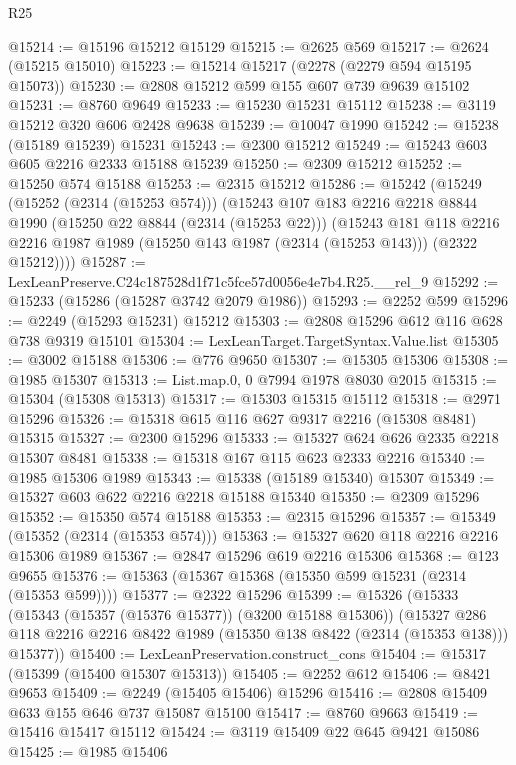 \begin{lexlean}{R25}
\begin{coremodule}
@15214 := @15196 @15212 @15129
@15215 := @2625 @569
@15217 := @2624 (@15215 @15010)
@15223 := @15214 @15217 (@2278 (@2279 @594 @15195 @15073))
@15230 := @2808 @15212 @599 @155 @607 @739 @9639 @15102
@15231 := @8760 @9649
@15233 := @15230 @15231 @15112
@15238 := @3119 @15212 @320 @606 @2428 @9638
@15239 := @10047 @1990
@15242 := @15238 (@15189 @15239) @15231
@15243 := @2300 @15212
@15249 := @15243 @603 @605 @2216 @2333 @15188 @15239
@15250 := @2309 @15212
@15252 := @15250 @574 @15188
@15253 := @2315 @15212
@15286 := @15242
    (@15249
      (@15252 (@2314 (@15253 @574)))
      (@15243
        @107
        @183
        @2216
        @2218
        @8844
        @1990
        (@15250 @22 @8844 (@2314 (@15253 @22)))
        (@15243
          @181
          @118
          @2216
          @2216
          @1987
          @1989
          (@15250 @143 @1987 (@2314 (@15253 @143)))
          (@2322 @15212))))
@15287 := LexLeanPreserve.C24c187528d1f71c5fce57d0056e4e7b4.R25.__rel_9
@15292 := @15233 (@15286 (@15287 @3742 @2079 @1986))
@15293 := @2252 @599
@15296 := @2249 (@15293 @15231) @15212
@15303 := @2808 @15296 @612 @116 @628 @738 @9319 @15101
@15304 := LexLeanTarget.TargetSyntax.Value.list
@15305 := @3002 @15188
@15306 := @776 @9650
@15307 := @15305 @15306
@15308 := @1985 @15307
@15313 := List.map.{0, 0} @7994 @1978 @8030 @2015
@15315 := @15304 (@15308 @15313)
@15317 := @15303 @15315 @15112
@15318 := @2971 @15296
@15326 := @15318 @615 @116 @627 @9317 @2216 (@15308 @8481) @15315
@15327 := @2300 @15296
@15333 := @15327 @624 @626 @2335 @2218 @15307 @8481
@15338 := @15318 @167 @115 @623 @2333 @2216
@15340 := @1985 @15306 @1989
@15343 := @15338 (@15189 @15340) @15307
@15349 := @15327 @603 @622 @2216 @2218 @15188 @15340
@15350 := @2309 @15296
@15352 := @15350 @574 @15188
@15353 := @2315 @15296
@15357 := @15349 (@15352 (@2314 (@15353 @574)))
@15363 := @15327 @620 @118 @2216 @2216 @15306 @1989
@15367 := @2847 @15296 @619 @2216 @15306
@15368 := @123 @9655
@15376 := @15363 (@15367 @15368 (@15350 @599 @15231 (@2314 (@15353 @599))))
@15377 := @2322 @15296
@15399 := @15326
    (@15333
      (@15343 (@15357 (@15376 @15377)) (@3200 @15188 @15306))
      (@15327 @286 @118 @2216 @2216 @8422 @1989 (@15350 @138 @8422 (@2314 (@15353 @138))) @15377))
@15400 := LexLeanPreservation.construct_cons
@15404 := @15317 (@15399 (@15400 @15307 @15313))
@15405 := @2252 @612
@15406 := @8421 @9653
@15409 := @2249 (@15405 @15406) @15296
@15416 := @2808 @15409 @633 @155 @646 @737 @15087 @15100
@15417 := @8760 @9663
@15419 := @15416 @15417 @15112
@15424 := @3119 @15409 @22 @645 @9421 @15086
@15425 := @1985 @15406

\end{coremodule}
\end{lexlean}
